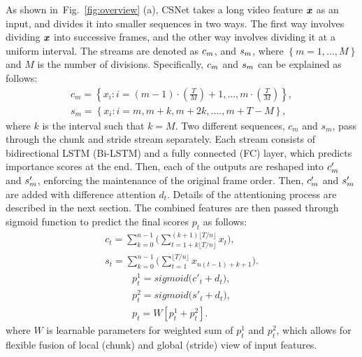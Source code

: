 \documentclass[letterpaper]{article} \usepackage{aaai19}  \usepackage{times}  \usepackage{helvet}  \usepackage{courier}  \usepackage{url}  \usepackage{graphicx}  \frenchspacing  \setlength{\pdfpagewidth}{8.5in}  \setlength{\pdfpageheight}{11in}
\newcommand{\figref}[1]{Fig.~\ref{#1}}
\begin{document}
As shown in~\figref{fig:overview} (a), CSNet takes a long video feature $\textbf{\textit{x}}$ as an input, and divides it into  smaller sequences in two ways. The first way involves dividing $\textbf{\textit{x}}$ into successive frames, and the other way involves dividing it at a uniform interval. The streams are denoted as $\textbf{\textit{$c_{m}$}}$, and $\textbf{\textit{$s_{m}$}}$, where $\left \{m = 1,..., M \right \}$ and $M$ is the number of divisions. Specifically, $\textbf{\textit{$c_{m}$}}$ and $\textbf{\textit{$s_{m}$}}$ can be explained as follows:
\begin{eqnarray}
c_{m} = \left \{ x_{i} : i = (m-1)\cdot(\frac{T}{M}) +1,..., m \cdot (\frac{T}{M}) \right \},\\
s_{m} = \left \{ x_{i} : i = m, m+k, m+2k, ...., m+T-M  \right \},
\label{equ:csnet1}
\end{eqnarray}
where $k$ is the interval such that $k=M$. Two different sequences, $c_{m}$ and $s_{m}$, pass through the chunk and stride stream separately. Each stream consists of bidirectional LSTM (Bi-LSTM) and a fully connected (FC) layer, which predicts importance scores at the end. Then, each of the outputs are reshaped into $\textbf{\textit{$c_{m}'$}}$ and $\textbf{\textit{$s_{m}'$}}$, enforcing the maintenance of the original frame order. Then, $\textbf{\textit{$c_{m}'$}}$ and $\textbf{\textit{$s_{m}'$}}$ are added with difference attention $d_t$. Details of the attentioning process are described in the next section. The combined features are then passed through sigmoid function to predict the final scores $p_t$ as follows:
\begin{eqnarray}
c_{t} = \sum\limits_{k=0}^{n-1} \Bigg( \sum\limits_{t=1 + k\lfloor{}T/n\rfloor{}}^{(k+1)\lfloor{}T/n\rfloor{}} {x_t} \Bigg),\\
s_{t} = \sum\limits_{k=0}^{n-1} \Bigg( \sum\limits_{t=1}^{\lfloor{}T/n\rfloor{}} {x_{n(t-1) + k+1}} \Bigg).
\label{equ:csnet2}
\end{eqnarray}
\fi
\begin{eqnarray}
p^1_t = \textit{sigmoid}\Big(c'_{t} + d_t\Big),\\
p^2_t = \textit{sigmoid}\Big(s'_{t} + d_t\Big),\\
p_t = W[p^1_t + p^2_t].
\label{equ:csnet3}
\end{eqnarray}
where $W$ is learnable parameters for weighted sum of $p^1_t$ and $p^2_t$, which allows for flexible fusion of local (chunk) and global (stride) view of input features. 
\end{document}
